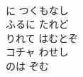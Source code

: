 \documentclass[10pt,b5j]{tarticle} %
\begin{document}
\begin{enumerate}
\begin{minipage}[c]{\blocksize}
    \end{minipage}
    \begin{minipage}[c]{\blocksize}

        \vspace{\linespace}
        \item~\\
        に つくもなし\\
        ふるに たれど\\
        りれて はむとぞ\\
        コチャ わせし\\
        のは ぞむ\\

    \end{minipage}
\end{enumerate} %
\end{document}

